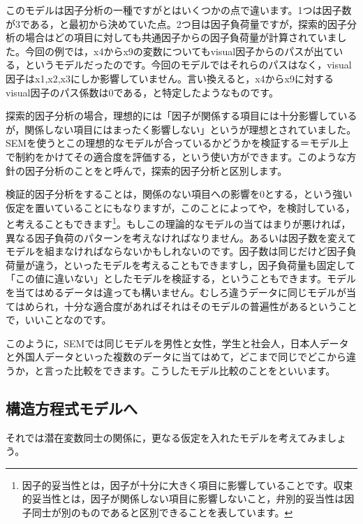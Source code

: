 \documentclass{ltjsbook}
\begin{document}
このモデルは因子分析の一種ですがとはいくつかの点で違います。1つは因子数が3である，と最初から決めていた点。2つ目は因子負荷量ですが，探索的因子分析の場合はどの項目に対しても共通因子からの因子負荷量が計算されていました。今回の例では，x4からx9の変数についてもvisual因子からのパスが出ている，というモデルだったのです。今回のモデルではそれらのパスはなく，visual因子はx1,x2,x3にしか影響していません。言い換えると，x4からx9に対するvisual因子のパス係数は0である，と特定したようなものです。

探索的因子分析の場合，理想的には「因子が関係する項目には十分影響しているが，関係しない項目にはまったく影響しない」というが理想とされていました。SEMを使うとこの理想的なモデルが合っているかどうかを検証する＝モデル上で制約をかけてその適合度を評価する，という使い方ができます。このような方針の因子分析のことをと呼んで，探索的因子分析と区別します。

検証的因子分析をすることは，関係のない項目への影響を0とする，という強い仮定を置いていることにもなりますが，このことによってや，を検討している，と考えることもできます\footnote{因子的妥当性とは，因子が十分に大きく項目に影響していることです。収束的妥当性とは，因子が関係しない項目に影響しないこと，弁別的妥当性は因子同士が別のものであると区別できることを表しています。}。もしこの理論的なモデルの当てはまりが悪ければ，異なる因子負荷のパターンを考えなければなりません。あるいは因子数を変えてモデルを組まなければならないかもしれないのです。因子数は同じだけど因子負荷量が違う，といったモデルを考えることもできますし，因子負荷量も固定して「この値に違いない」としたモデルを検証する，ということもできます。モデルを当てはめるデータは違っても構いません。むしろ違うデータに同じモデルが当てはめられ，十分な適合度があればそれはそのモデルの普遍性があるということで，いいことなのです。

このように，SEMでは同じモデルを男性と女性，学生と社会人，日本人データと外国人データといった複数のデータに当てはめて，どこまで同じでどこから違うか，と言った比較をできます。こうしたモデル比較のことをといいます。

\subsection{構造方程式モデルへ}
それでは潜在変数同士の関係に，更なる仮定を入れたモデルを考えてみましょう。
\end{document}
